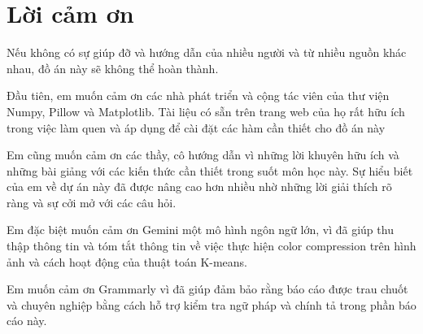 \section{Lời cảm ơn}
Nếu không có sự giúp đỡ và hướng dẫn của nhiều người và từ nhiều nguồn khác nhau, đồ án này sẽ không thể hoàn thành.

Đầu tiên, em muốn cảm ơn các nhà phát triển và cộng tác viên của thư viện Numpy, Pillow và Matplotlib. Tài liệu có sẵn trên trang web của họ rất hữu ích trong việc làm quen và áp dụng để cài đặt các hàm cần thiết cho đồ án này

Em cũng muốn cảm ơn các thầy, cô hướng dẫn vì những lời khuyên hữu ích và những bài giảng với các kiến thức cần thiết trong suốt môn học này. Sự hiểu biết của em về dự án này đã được nâng cao hơn nhiều nhờ những lời giải thích rõ ràng và sự cởi mở với các câu hỏi.

Em đặc biệt muốn cảm ơn Gemini một mô hình ngôn ngữ lớn, vì đã giúp thu thập thông tin và tóm tắt thông tin về việc thực hiện color compression trên hình ảnh và cách hoạt động của thuật toán K-means.

Em muốn cảm ơn Grammarly vì đã giúp đảm bảo rằng báo cáo được trau chuốt và chuyên nghiệp bằng cách hỗ trợ kiểm tra ngữ pháp và chính tả trong phần báo cáo này.